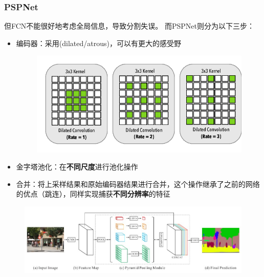 \subsubsection{PSPNet}
但FCN不能很好地考虑全局信息，导致分割失误。
而PSPNet\cite{zhao:pspnet_2017}则分为以下三步：
\begin{itemize}
	\item 编码器：采用(dilated/atrous)，可以有更大的感受野
	\begin{figure}[H]
	\centering
	\includegraphics[width=0.6\linewidth]{fig/dilated_convolution.png}
	\end{figure}
	\item 金字塔池化：在\textbf{不同尺度}进行池化操作
	\item 合并：将上采样结果和原始编码器结果进行合并，这个操作继承了之前的网络的优点（跳连），同样实现捕获\textbf{不同分辨率}的特征
\end{itemize}

\begin{figure}[H]
\centering
\includegraphics[width=0.9\linewidth]{fig/pspnet.jpg}
\end{figure}

